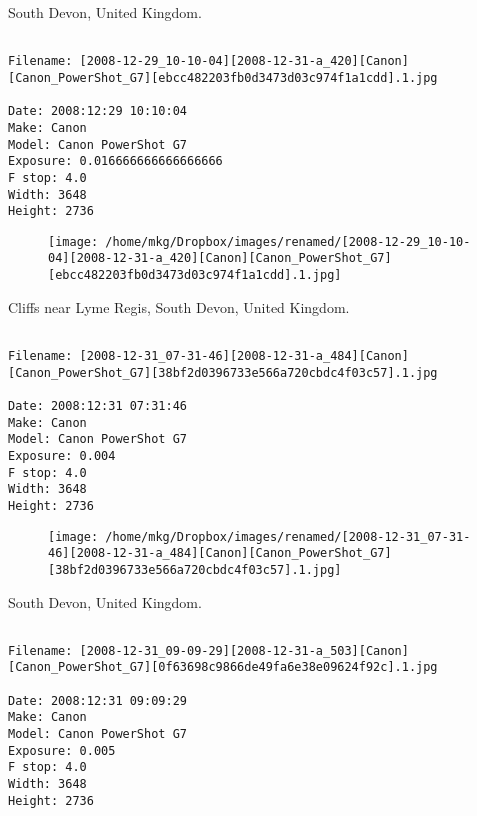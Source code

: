\clearpage
\onecolumn
\noindent South Devon, United Kingdom.
\noindent
\begin{lstlisting}

Filename: [2008-12-29_10-10-04][2008-12-31-a_420][Canon][Canon_PowerShot_G7][ebcc482203fb0d3473d03c974f1a1cdd].1.jpg

Date: 2008:12:29 10:10:04
Make: Canon
Model: Canon PowerShot G7
Exposure: 0.016666666666666666
F stop: 4.0
Width: 3648
Height: 2736
\end{lstlisting}
\clearpage

\begin{figure}
\texttt{[image: /home/mkg/Dropbox/images/renamed/[2008-12-29\_10-10-04][2008-12-31-a\_420][Canon][Canon\_PowerShot\_G7][ebcc482203fb0d3473d03c974f1a1cdd].1.jpg]}
\end{figure}
    
\clearpage
\onecolumn
\noindent Cliffs near Lyme Regis, South Devon, United Kingdom.
\noindent
\begin{lstlisting}

Filename: [2008-12-31_07-31-46][2008-12-31-a_484][Canon][Canon_PowerShot_G7][38bf2d0396733e566a720cbdc4f03c57].1.jpg

Date: 2008:12:31 07:31:46
Make: Canon
Model: Canon PowerShot G7
Exposure: 0.004
F stop: 4.0
Width: 3648
Height: 2736
\end{lstlisting}
\clearpage

\begin{figure}
\texttt{[image: /home/mkg/Dropbox/images/renamed/[2008-12-31\_07-31-46][2008-12-31-a\_484][Canon][Canon\_PowerShot\_G7][38bf2d0396733e566a720cbdc4f03c57].1.jpg]}
\end{figure}
    
\clearpage
\onecolumn
\noindent South Devon, United Kingdom.
\noindent
\begin{lstlisting}

Filename: [2008-12-31_09-09-29][2008-12-31-a_503][Canon][Canon_PowerShot_G7][0f63698c9866de49fa6e38e09624f92c].1.jpg

Date: 2008:12:31 09:09:29
Make: Canon
Model: Canon PowerShot G7
Exposure: 0.005
F stop: 4.0
Width: 3648
Height: 2736
\end{lstlisting}
\clearpage

